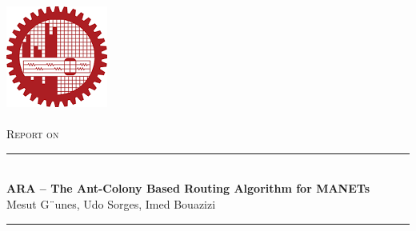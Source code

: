 \begin{titlepage}

\newcommand{\HRule}{\rule{\linewidth}{0.5mm}} %

\center %


\includegraphics{logo.png}\\[.1cm] %


\\[1.5cm] %

%
\textsc{\Large Report on }\\[0.5cm] %

\HRule \\[0.4cm]
{ \huge \bfseries ARA – The Ant-Colony Based Routing Algorithm for MANETs}\\[0.4cm] %
{Mesut G¨unes, Udo Sorges, Imed Bouazizi}
\HRule \\[1cm]
 


\end{titlepage}
